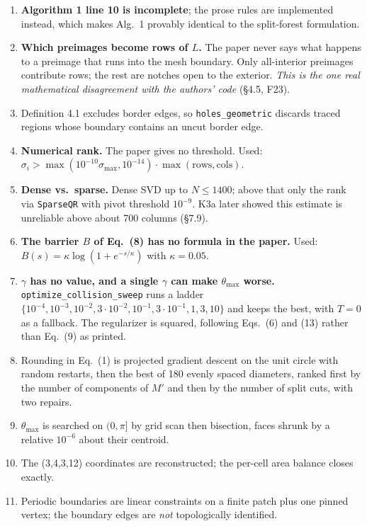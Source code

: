 \documentclass[10pt,a4paper]{article}
\newcommand{\fn}[1]{\nolinkurl{#1}}
\begin{document}
\begin{enumerate}[nosep,leftmargin=6mm]
\item \textbf{Algorithm 1 line 10 is incomplete}; the prose rules are implemented instead,
      which makes Alg.~1 provably identical to the split-forest formulation.
\item \textbf{Which preimages become rows of $L$.} The paper never says what happens to a
      preimage that runs into the mesh boundary. Only all-interior preimages contribute rows;
      the rest are notches open to the exterior. \emph{This is the one real mathematical
      disagreement with the authors' code} (\S4.5, F23).
\item Definition 4.1 excludes border edges, so \fn{holes_geometric} discards traced regions
      whose boundary contains an uncut border edge.
\item \textbf{Numerical rank.} The paper gives no threshold. Used:
      $\sigma_i > \max(10^{-10}\sigma_{\max}, 10^{-14})\cdot\max(\text{rows},\text{cols})$.
\item \textbf{Dense vs.\ sparse.} Dense SVD up to $N\le 1400$; above that only the rank via
      \texttt{SparseQR} with pivot threshold $10^{-9}$. K3a later showed this estimate is
      unreliable above about 700 columns (\S7.9).
\item \textbf{The barrier $B$ of Eq.~(8) has no formula in the paper.} Used:
      $B(s) = \kappa\log(1+e^{-s/\kappa})$ with $\kappa = 0.05$.
\item \textbf{$\gamma$ has no value, and a single $\gamma$ can make $\theta_{\max}$ worse.}
      \fn{optimize_collision_sweep} runs a ladder
      $\{10^{-4},10^{-3},10^{-2},3\!\cdot\!10^{-2},10^{-1},3\!\cdot\!10^{-1},1,3,10\}$ and keeps
      the best, with $T=0$ as a fallback. The regularizer is squared, following Eqs.~(6) and
      (13) rather than Eq.~(9) as printed.
\item Rounding in Eq.~(1) is projected gradient descent on the unit circle with random
      restarts, then the best of 180 evenly spaced diameters, ranked first by the number of
      components of $M'$ and then by the number of split cuts, with two repairs.
\item[9.] $\theta_{\max}$ is searched on $(0,\pi]$ by grid scan then bisection, faces shrunk by a
      relative $10^{-6}$ about their centroid.
\item[10.] The (3,4,3,12) coordinates are reconstructed; the per-cell area balance closes exactly.
\item[11.] Periodic boundaries are linear constraints on a finite patch plus one pinned vertex;
      the boundary edges are \emph{not} topologically identified.
\end{enumerate}
\end{document}
